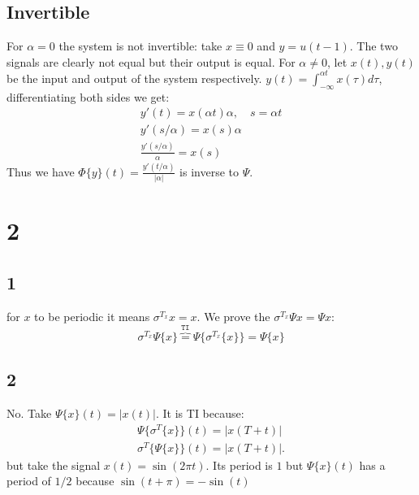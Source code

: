 \subsection{Invertible}
For $\alpha=0$ the system is not invertible: take $x\equiv 0$ and $y=u(t-1)$. The two signals are clearly not equal but their output is equal. For $\alpha\neq 0$, let $x(t),y(t)$ be the input and output of the system respectively. $y(t)=\int_{-\infty}^{\alpha t}x(\tau)d\tau$, differentiating both sides we get:
\begin{align*}
    y'(t)=x(\alpha t)\alpha,\quad s=\alpha t\\
    y'(s/\alpha)=x(s)\alpha\\
    \frac{y'(s/\alpha)}{\alpha}=x(s)
\end{align*}
Thus we have $\Phi\{y\}(t)=\frac{y'(t/\alpha)}{|\alpha|}$ is inverse to $\Psi$.

\section{2}
\subsection{1}
for $x$ to be periodic it means $\sigma^{T_x}x=x$. We prove the $\sigma^{T_x}\Psi{x}=\Psi{x}$:
\begin{equation}
    \sigma^{T_x}\Psi\{x\}\overbrace{=}^\texttt{TI}
    \Psi\{\sigma^{T_x}\{x\}\}=\Psi\{x\}
\end{equation}
\subsection{2}
No. Take $\Psi\{x\}(t)=|x(t)|$. It is TI because:
\begin{align*}
    \Psi\{\sigma^T\{x\}\}(t)=|x(T+t)|\\
    \sigma^T\{\Psi\{x\}\}(t)=|x(T+t)|.
\end{align*}
but take the signal $x(t)=\sin(2\pi t)$. Its period is $1$ but $\Psi\{x\}(t)$ has a period of $1/2$ because $\sin(t+\pi)=-\sin(t)$
